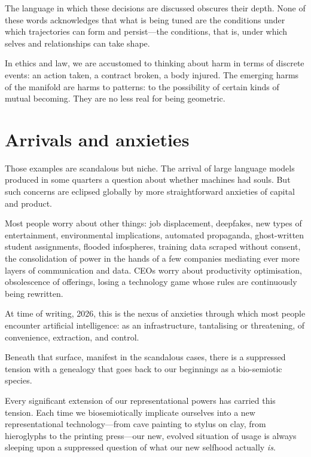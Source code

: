 The language in which these decisions are discussed obscures their depth. None of these words acknowledges that what is being tuned are the conditions under which trajectories can form and persist---the conditions, that is, under which selves and relationships can take shape.

In ethics and law, we are accustomed to thinking about harm in terms of discrete events: an action taken, a contract broken, a body injured. The emerging harms of the manifold are harms to patterns: to the possibility of certain kinds of mutual becoming. They are no less real for being geometric.



\section{Arrivals and anxieties}

Those examples are scandalous but niche. The arrival of large language models produced in some quarters a question about whether machines had souls. But such concerns are eclipsed globally by more straightforward anxieties of capital and product.

Most people worry about other things: job displacement, deepfakes, new types of entertainment, environmental implications, automated propaganda, ghost-written student assignments, flooded infospheres, training data scraped without consent, the consolidation of power in the hands of a few companies mediating ever more layers of communication and data. CEOs worry about productivity optimisation, obsolescence of offerings, losing a technology game whose rules are continuously being rewritten.

At time of writing, 2026, this is the nexus of anxieties through which most people encounter artificial intelligence: as an infrastructure, tantalising or threatening, of convenience, extraction, and control.

Beneath that surface, manifest in the scandalous cases, there is a suppressed tension with a genealogy that goes back to our beginnings as a bio-semiotic species.

Every significant extension of our representational powers has carried this tension. Each time we biosemiotically implicate ourselves into a new representational technology---from cave painting to stylus on clay, from hieroglyphs to the printing press---our new, evolved situation of usage is always sleeping upon a suppressed question of what our new selfhood actually \textit{is}.

